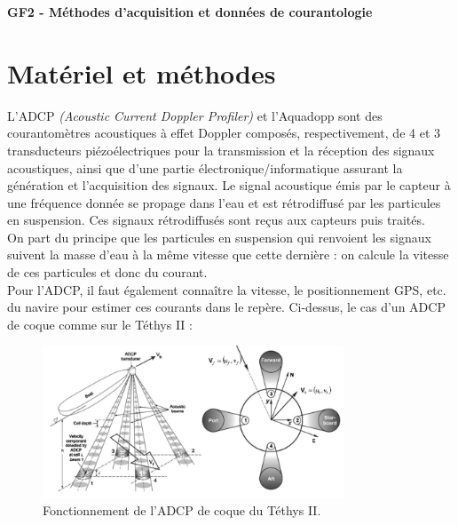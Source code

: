 \documentclass[12pt]{article}
\begin{document}
	
\thispagestyle{empty}
\begin{center}
\begin{LARGE}
\begin{center}
	\textbf{GF2 - Méthodes d’acquisition et données de courantologie}
\end{center}
\end{LARGE}
\end{center}

\section{Matériel et méthodes}
L'ADCP \textit{(Acoustic Current Doppler Profiler)} et l'Aquadopp sont des courantomètres acoustiques à effet Doppler composés, respectivement, de 4 et 3 transducteurs piézoélectriques pour la transmission et la réception des signaux acoustiques, ainsi que d’une partie électronique/informatique assurant la génération et l’acquisition des signaux. Le signal acoustique émis par le capteur à une fréquence donnée se propage dans l’eau et est rétrodiffusé par les particules en suspension. Ces signaux rétrodiffusés sont reçus aux capteurs puis traités.\\
\indent On part du principe que les particules en suspension qui renvoient les signaux suivent la masse d’eau à la même vitesse que cette dernière : on calcule la vitesse de ces particules et donc du courant.\\
\indent Pour l'ADCP, il faut également connaître la vitesse, le positionnement GPS, etc. du navire pour estimer ces courants dans le repère. Ci-dessus, le cas d'un ADCP de coque comme sur le Téthys II :

\begin{figure}[!ht]
	\begin{center}
		\includegraphics[width=0.8\textwidth]{adcp.png}
		\caption{Fonctionnement de l'ADCP de coque du Téthys II.}
	\end{center}
\end{figure}
\end{document}
